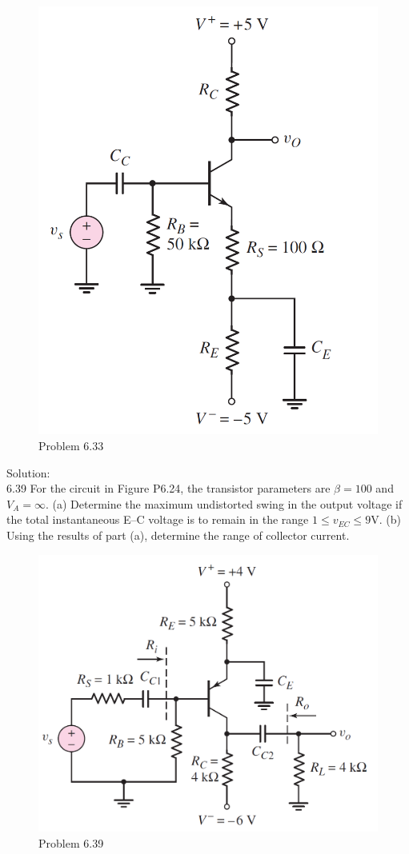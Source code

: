 \documentclass[a4paper,11pt,UTF8]{article}
\begin{document}
\begin{figure}[H] 
	\centering 
	\includegraphics[scale=0.20]{MD6.33.png}
	\caption{Problem 6.33}
\end{figure}
\noindent Solution:\\
6.39 For the circuit in Figure P6.24, the transistor parameters are $\beta = 100$ and
$V_A =\infty$. (a) Determine the maximum undistorted swing in the output
voltage if the total instantaneous E–C voltage is to remain in the range
$1 \leq v_{EC} \leq 9 $V. (b) Using the results of part (a), determine the range of collector
current.
\begin{figure}[H] 
	\centering 
	\includegraphics[scale=0.3]{MD6.39.png}
	\caption{Problem 6.39}
\end{figure}
\end{document}
